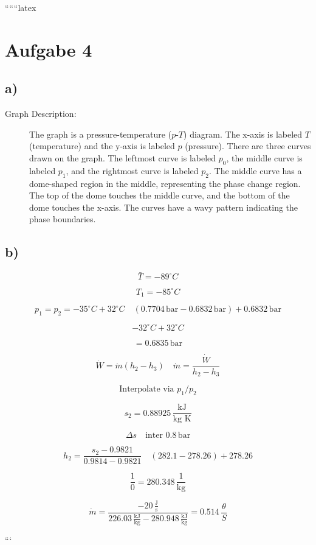 
``````latex


\section*{Aufgabe 4}

\subsection*{a)}

\begin{description}
    \item[Graph Description:] The graph is a pressure-temperature ($p$-$T$) diagram. The x-axis is labeled $T$ (temperature) and the y-axis is labeled $p$ (pressure). There are three curves drawn on the graph. The leftmost curve is labeled $p_0$, the middle curve is labeled $p_1$, and the rightmost curve is labeled $p_2$. The middle curve has a dome-shaped region in the middle, representing the phase change region. The top of the dome touches the middle curve, and the bottom of the dome touches the x-axis. The curves have a wavy pattern indicating the phase boundaries.
\end{description}

\subsection*{b)}

\[
\bar{T} = -89^\circ C
\]

\[
T_1 = -85^\circ C
\]

\[
p_1 = p_2 = -35^\circ C + 32^\circ C \quad \left(0.7704 \, \text{bar} - 0.6832 \, \text{bar}\right) + 0.6832 \, \text{bar}
\]

\[
-32^\circ C + 32^\circ C
\]

\[
= 0.6835 \, \text{bar}
\]

\[
\dot{W} = \dot{m} (h_2 - h_3) \quad \dot{m} = \frac{\dot{W}}{h_2 - h_3}
\]

\[
\text{Interpolate via } p_1/p_2
\]

\[
s_2 = 0.88925 \, \frac{\text{kJ}}{\text{kg K}}
\]

\[
\Delta s \quad \text{inter } 0.8 \, \text{bar}
\]

\[
h_2 = \frac{s_2 - 0.9821}{0.9814 - 0.9821} \quad \left(282.1 - 278.26\right) + 278.26
\]

\[
\frac{1}{0} = 280.348 \, \frac{1}{\text{kg}}
\]

\[
\dot{m} = \frac{-20 \, \frac{\text{J}}{\text{s}}}{226.03 \, \frac{\text{kJ}}{\text{kg}} - 280.948 \, \frac{\text{kJ}}{\text{kg}}} = 0.514 \, \frac{\theta}{S}
\]

```